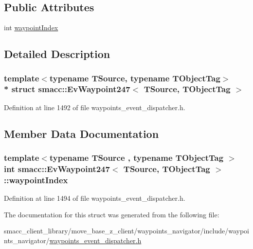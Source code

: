 \subsection*{Public Attributes}
\begin{DoxyCompactItemize}
\item 
int \hyperlink{structsmacc_1_1EvWaypoint247_af06625992dc34cb33b4d6de87d122e2a}{waypoint\+Index}
\end{DoxyCompactItemize}


\subsection{Detailed Description}
\subsubsection*{template$<$typename T\+Source, typename T\+Object\+Tag$>$\\*
struct smacc\+::\+Ev\+Waypoint247$<$ T\+Source, T\+Object\+Tag $>$}



Definition at line 1492 of file waypoints\+\_\+event\+\_\+dispatcher.\+h.



\subsection{Member Data Documentation}
\subsubsection[{\texorpdfstring{waypoint\+Index}{waypointIndex}}]{\setlength{\rightskip}{0pt plus 5cm}template$<$typename T\+Source , typename T\+Object\+Tag $>$ int {\bf smacc\+::\+Ev\+Waypoint247}$<$ T\+Source, T\+Object\+Tag $>$\+::waypoint\+Index}\hypertarget{structsmacc_1_1EvWaypoint247_af06625992dc34cb33b4d6de87d122e2a}{}\label{structsmacc_1_1EvWaypoint247_af06625992dc34cb33b4d6de87d122e2a}


Definition at line 1494 of file waypoints\+\_\+event\+\_\+dispatcher.\+h.



The documentation for this struct was generated from the following file\+:\begin{DoxyCompactItemize}
\item 
smacc\+\_\+client\+\_\+library/move\+\_\+base\+\_\+z\+\_\+client/waypoints\+\_\+navigator/include/waypoints\+\_\+navigator/\hyperlink{waypoints__event__dispatcher_8h}{waypoints\+\_\+event\+\_\+dispatcher.\+h}\end{DoxyCompactItemize}
